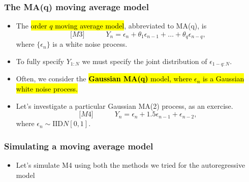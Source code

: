 \documentclass[]{article}
\providecommand{\tightlist}{%
  \setlength{\itemsep}{0pt}\setlength{\parskip}{0pt}}
\begin{document}
\subsubsection{The MA(q) moving average
model}\label{the-maq-moving-average-model}

\begin{itemize}
\item
  The \hl{order $q$ moving average model}, abbreviated to MA(q), is
  $${[}M3{]}
  \quad\quad \quad Y_n = \epsilon_n +\theta_1 \epsilon_{n-1} +\dots+\theta_q\epsilon_{n-q},$$
  where \(\{\epsilon_n\}\) is a white noise process.
\item
  To fully specify \(Y_{1:N}\) we must specify the joint distribution of
  \(\epsilon_{1-q:N}\).
\item
  Often, we consider the \hl{\textbf{Gaussian MA(q)} model, where
  $\epsilon_n$ is a Gaussian white noise process.}
\item
  Let's investigate a particular Gaussian MA(2) process, as an exercise.
  $${[}M4{]}
  \quad\quad \quad Y_n = \epsilon_n + 1.5\epsilon_{n-1}+\epsilon_{n-2},$$
  where \(\epsilon_n\sim \mathrm{IID} N[0,1]\).
\end{itemize}

\subsubsection{Simulating a moving average
model}\label{simulating-a-moving-average-model}

\begin{itemize}
\tightlist
\item
  Let's simulate M4 using both the methods we tried for the
  autoregressive model
\end{itemize}
\end{document}
